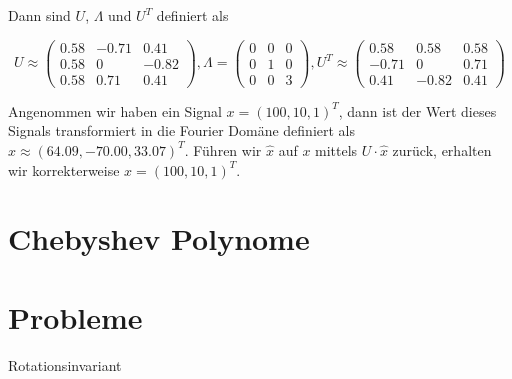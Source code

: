 Dann sind $U$, $\Lambda$ und $U^T$ definiert als

\begin{equation}
  U \approx \begin{pmatrix}
    0.58 & -0.71 & 0.41\\
    0.58 & 0 & -0.82\\
    0.58 & 0.71 & 0.41
  \end{pmatrix},
  \Lambda = \begin{pmatrix}
    0 & 0 & 0\\
    0 & 1 & 0\\
    0 & 0 & 3
  \end{pmatrix},
  U^T \approx \begin{pmatrix}
    0.58 & 0.58 & 0.58\\
    -0.71 & 0 & 0.71\\
    0.41 & -0.82 & 0.41
  \end{pmatrix}
\end{equation}

Angenommen wir haben ein Signal $x = {(100, 10, 1)}^T$, dann ist der Wert dieses Signals transformiert in die Fourier Domäne definiert als $\hat x \approx {(64.09, -70.00, 33.07)}^T$.
Führen wir $\hat x$ auf $x$ mittels $U \cdot \hat x$ zurück, erhalten wir korrekterweise $x = {(100, 10, 1)}^T$.

\section{Chebyshev Polynome}

\section{Probleme}

Rotationsinvariant
